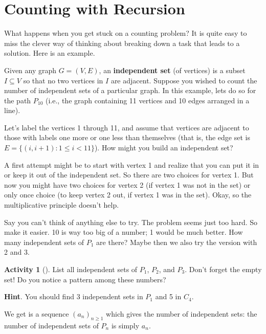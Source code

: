 \documentclass[10pt,]{book}
\newcommand{\terminology}[1]{\textbf{#1}}
\theoremstyle{plain}
\theoremstyle{definition}
\theoremstyle{definition}
\theoremstyle{definition}
\newtheorem{activity}[project]{Activity}
\numberwithin{equation}{chapter}
\def\st{:}
\newcommand{\lt}{<}
\begin{document}
\section[{Counting with Recursion}]{Counting with Recursion}\label{sec_basic-recursion}
\hypertarget{p-881}{}%
What happens when you get stuck on a counting problem?  It is quite easy to miss the clever way of thinking about breaking down a task that leads to a solution.  Here is an example.%
\par
\hypertarget{p-882}{}%
Given any graph \(G = (V, E)\), an \terminology{independent set} (of vertices) is a subset \(I \subseteq V\) so that no two vertices in \(I\) are adjacent.  Suppose you wished to count the number of independent sets of a particular graph.  In this example, lets do so for the path \(P_{10}\) (i.e., the graph containing 11 vertices and 10 edges arranged in a line).%
\par
\hypertarget{p-883}{}%
Let's label the vertices 1 through 11, and assume that vertices are adjacent to those with labels one more or one less than themselves (that is, the edge set is \(E = \{(i,i+1) \st 1 \le i \lt 11\}\)).  How might you build an independent set?%
\par
\hypertarget{p-884}{}%
A first attempt might be to start with vertex 1 and realize that you can put it in or keep it out of the independent set.  So there are two choices for vertex 1.  But now you might have two choices for vertex 2 (if vertex 1 was not in the set) or only once choice (to keep vertex 2 out, if vertex 1 was in the set).  Okay, so the multiplicative principle doesn't help.%
\par
\hypertarget{p-885}{}%
Say you can't think of anything else to try.  The problem seems just too hard.  So make it easier.  10 is way too big of a number; 1 would be much better.  How many independent sets of \(P_1\) are there?  Maybe then we also try the version with 2 and 3.%
\begin{activity}[]\label{activity-125}
\hypertarget{p-886}{}%
List all independent sets of \(P_1\), \(P_2\), and \(P_3\).  Don't forget the empty set! Do you notice a pattern among these numbers?%
\par\smallskip%
\noindent\textbf{Hint}.\hypertarget{hint-90}{}\quad%
\hypertarget{p-887}{}%
You should find 3 independent sets in \(P_1\) and 5 in \(C_4\).%
\end{activity}
\hypertarget{p-888}{}%
We get is a sequence \((a_n)_{n \ge 1}\) which gives the number of independent sets: the number of independent sets of \(P_n\) is simply \(a_n\).%
\end{document}
